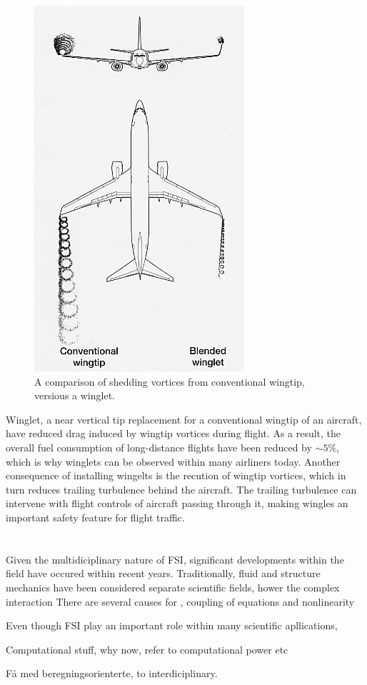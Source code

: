 \begin{figure}
  \begin{center}
  \includegraphics[scale=0.5]{./Fig/winglet.png}
  \end{center}
  \caption{A comparison of shedding vortices from conventional wingtip, versious a winglet.}
\end{figure}
 Winglet, a near vertical tip replacement for a conventional wingtip of an aircraft, have reduced  drag induced by wingtip vortices during flight. As a result, the overall fuel consumption of long-distance flights have been reduced by $\sim 5 \%$, which is why winglets can be observed within many airliners today.  Another consequence of installing wingelts is the recution of wingtip vortices, which in turn reduces trailing turbulence behind the aircraft.  The trailing turbulence can intervene with flight controls of aircraft passing through it, making  wingles an important safety feature for flight traffic. \\ \\ \\


Given the multidiciplinary nature  of FSI, significant developments within the field have occured within recent years.
Traditionally, fluid and structure mechanics have been considered separate scientific fields, hower the complex interaction There are several causes for ,
coupling of equations and nonlinearity

Even though FSI play an important role within many scientific apllications,

Computational stuff, why now, refer to computational power etc


Få med beregningsorienterte, to interdiciplinary. 